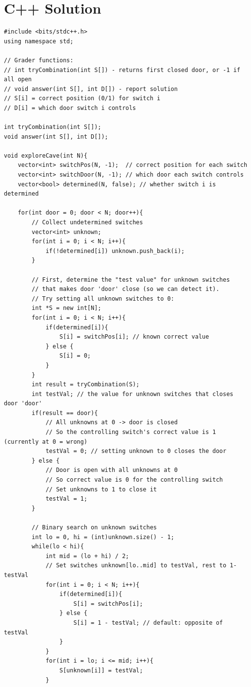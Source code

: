 \documentclass[11pt,a4paper]{article}
\begin{document}
\section{C++ Solution}
\begin{lstlisting}
#include <bits/stdc++.h>
using namespace std;

// Grader functions:
// int tryCombination(int S[]) - returns first closed door, or -1 if all open
// void answer(int S[], int D[]) - report solution
// S[i] = correct position (0/1) for switch i
// D[i] = which door switch i controls

int tryCombination(int S[]);
void answer(int S[], int D[]);

void exploreCave(int N){
    vector<int> switchPos(N, -1);  // correct position for each switch
    vector<int> switchDoor(N, -1); // which door each switch controls
    vector<bool> determined(N, false); // whether switch i is determined

    for(int door = 0; door < N; door++){
        // Collect undetermined switches
        vector<int> unknown;
        for(int i = 0; i < N; i++){
            if(!determined[i]) unknown.push_back(i);
        }

        // First, determine the "test value" for unknown switches
        // that makes door 'door' close (so we can detect it).
        // Try setting all unknown switches to 0:
        int *S = new int[N];
        for(int i = 0; i < N; i++){
            if(determined[i]){
                S[i] = switchPos[i]; // known correct value
            } else {
                S[i] = 0;
            }
        }
        int result = tryCombination(S);
        int testVal; // the value for unknown switches that closes door 'door'
        if(result == door){
            // All unknowns at 0 -> door is closed
            // So the controlling switch's correct value is 1 (currently at 0 = wrong)
            testVal = 0; // setting unknown to 0 closes the door
        } else {
            // Door is open with all unknowns at 0
            // So correct value is 0 for the controlling switch
            // Set unknowns to 1 to close it
            testVal = 1;
        }

        // Binary search on unknown switches
        int lo = 0, hi = (int)unknown.size() - 1;
        while(lo < hi){
            int mid = (lo + hi) / 2;
            // Set switches unknown[lo..mid] to testVal, rest to 1-testVal
            for(int i = 0; i < N; i++){
                if(determined[i]){
                    S[i] = switchPos[i];
                } else {
                    S[i] = 1 - testVal; // default: opposite of testVal
                }
            }
            for(int i = lo; i <= mid; i++){
                S[unknown[i]] = testVal;
            }


\end{lstlisting}
\end{document}
